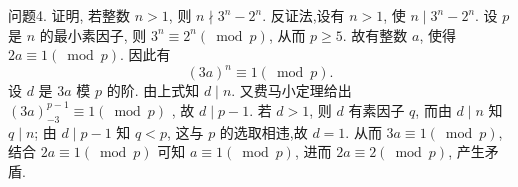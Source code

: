 问题4. 证明, 若整数 $n>1$, 则 $n \nmid 3^n-2^n$.
反证法,设有 $n>1$, 使 $n \mid 3^n-2^n$. 设 $p$ 是 $n$ 的最小素因子, 则 $3^n \equiv 2^n(\bmod p)$, 从而 $p \geqslant 5$. 故有整数 $a$, 使得 $2 a \equiv 1(\bmod p)$. 因此有
$$
(3 a)^n \equiv 1(\bmod p) .
$$
设 $d$ 是 $3 a$ 模 $p$ 的阶.
由上式知 $d \mid n$. 又费马小定理给出 $(3 a)_{-3}^{p-1} \equiv 1(\bmod p)$ ,
故 $d \mid p-1$. 若 $d>1$, 则 $d$ 有素因子 $q$, 而由 $d \mid n$ 知 $q \mid n$; 由 $d \mid p-1$ 知 $q< p$, 这与 $p$ 的选取相违,故 $d=1$. 从而 $3 a \equiv 1(\bmod p)$, 结合 $2 a \equiv 1(\bmod p)$ 可知 $a \equiv 1(\bmod p)$, 进而 $2 a \equiv 2(\bmod p)$, 产生矛盾.


